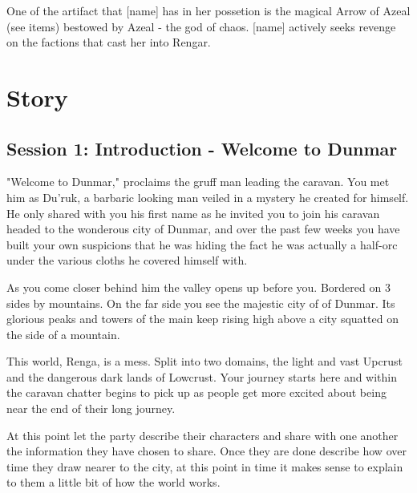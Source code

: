\documentclass[10pt,twoside,twocolumn]{article}
\begin{document}
One of the artifact that [name] has in her possetion is the magical Arrow of Azeal (see items) bestowed by Azeal - the god of chaos. [name] actively seeks revenge on the factions that cast her into Rengar. \\

\section{Story}

\subsection{Session 1: Introduction - Welcome to Dunmar}

\begin{quotebox}
"Welcome to Dunmar," proclaims the gruff man leading the caravan. You met him as Du'ruk, a barbaric looking man veiled in a mystery he created for himself. He only shared with you his first name as he invited you to join his caravan headed to the wonderous city of Dunmar, and over the past few weeks you have built your own suspicions that he was hiding the fact he was actually a half-orc under the various cloths he covered himself with.

As you come closer behind him the valley opens up before you. Bordered on 3 sides by mountains. On the far side you see the majestic city of of Dunmar. Its glorious peaks and towers of the main keep rising high above a city squatted on the side of a mountain.

This world, Renga, is a mess. Split into two domains, the light and vast Upcrust and the dangerous dark lands of Lowcrust. Your journey starts here and within the caravan chatter begins to pick up as people get more excited about being near the end of their long journey.
\end{quotebox}

At this point let the party describe their characters and share with one another the information they have chosen to share. Once they are done describe how over time they draw nearer to the city, at this point in time it makes sense to explain to them a little bit of how the world works.
\end{document}

